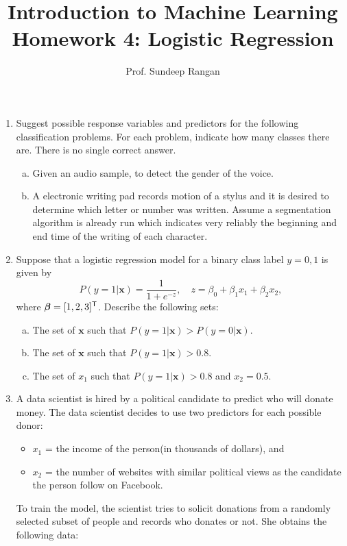 \documentclass[11pt]{article}
\newcommand{\xbf}{\mathbf{x}}
\def\betabf{{\boldsymbol \beta}}
\newcommand{\tran}{^{\text{\sf T}}}
\begin{document}
\title{Introduction to Machine Learning\\
Homework 4:  Logistic Regression}
\author{Prof. Sundeep Rangan}
\date{}

\maketitle

\begin{enumerate}

\item Suggest possible response variables and predictors for the following classification
problems.  For each problem, indicate how many classes there are.  There is no single
correct answer.
\begin{enumerate}[(a)]
\item Given an audio sample, to detect the gender of the voice.
\item A electronic writing pad records motion of a stylus 
and it is desired to determine
which letter or number was written.  Assume a segmentation algorithm is already run
which indicates very reliably the beginning and end time of the writing
of each character.
\end{enumerate}

\item Suppose that a logistic regression model for a binary class
label $y=0,1$ is given by
\[
    P(y=1|\xbf) = \frac{1}{1+e^{-z}}, \quad z = \beta_0 + \beta_1x_1 + \beta_2 x_2,
\]
where $\betabf = [1,2,3]\tran$.  Describe the following sets:
\begin{enumerate}[(a)]
\item The set of $\xbf$ such that $P(y=1|\xbf) > P(y=0|\xbf)$.
\item The set of $\xbf$ such that $P(y=1|\xbf) > 0.8$.
\item The set of $x_1$ such that $P(y=1|\xbf) > 0.8$ and $x_2=0.5$.
\end{enumerate}

\item A data scientist is hired by a 
political candidate to predict who will donate
money.  The data scientist decides to use two predictors for each possible donor:
\begin{itemize}
\item $x_1$ = the income of the person(in thousands of dollars), and
\item $x_2$ = the number of websites with similar political views as the
candidate the person follow on Facebook.
\end{itemize}
To train the model, the scientist
tries to solicit donations from a randomly selected subset
of people and records who donates or not.  She obtains the following data:


\end{enumerate}
\end{document}
